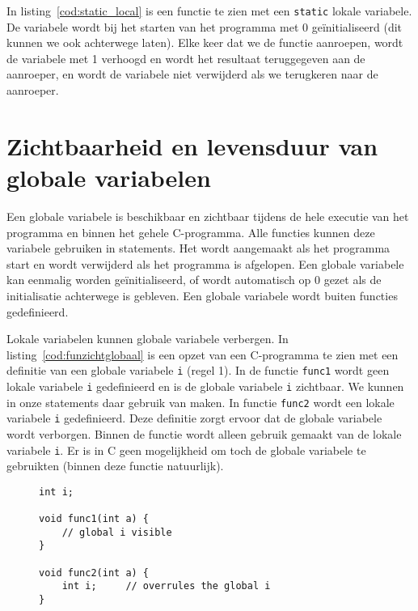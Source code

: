 In listing~\ref{cod:static_local} is een functie te zien met een \texttt{static} lokale variabele. De variabele wordt bij het starten van het programma met 0 geïnitialiseerd (dit kunnen we ook achterwege laten).
Elke keer dat we de functie aanroepen, wordt de variabele met 1 verhoogd en wordt het resultaat teruggegeven aan de aanroeper, en wordt de variabele niet verwijderd als we terugkeren naar de aanroeper.



\section{Zichtbaarheid en levensduur van globale variabelen}
Een globale variabele is beschikbaar en zichtbaar tijdens de hele executie van het programma en binnen het gehele C-programma. Alle functies kunnen deze variabele gebruiken in statements. Het wordt aangemaakt als het programma start en wordt verwijderd als het programma is afgelopen. Een globale variabele kan eenmalig worden geïnitialiseerd, of wordt automatisch op 0 gezet als de initialisatie achterwege is gebleven. Een globale variabele wordt buiten functies gedefinieerd.

Lokale variabelen kunnen globale variabele verbergen. In listing~\ref{cod:funzichtglobaal} is een opzet van een C-programma te zien met een definitie van een globale variabele \texttt{i} (regel 1). In de functie \texttt{func1} wordt geen lokale variabele \texttt{i} gedefinieerd en is de globale variabele \texttt{i} zichtbaar. We kunnen in onze statements daar gebruik van maken. In functie \texttt{func2} wordt een lokale variabele \texttt{i} gedefinieerd. Deze definitie zorgt ervoor dat de globale variabele wordt verborgen. Binnen de functie wordt alleen gebruik gemaakt van de lokale variabele \texttt{i}. Er is in C geen mogelijkheid om toch de globale variabele te gebruikten (binnen deze functie natuurlijk).

\begin{figure}[!ht]
\begin{lstlisting}[caption=Zichtbaarheid van globale variabelen.,label=cod:funzichtglobaal]
int i;

void func1(int a) {
    // global i visible
}

void func2(int a) {
    int i;     // overrules the global i
}
\end{lstlisting}
\end{figure}

